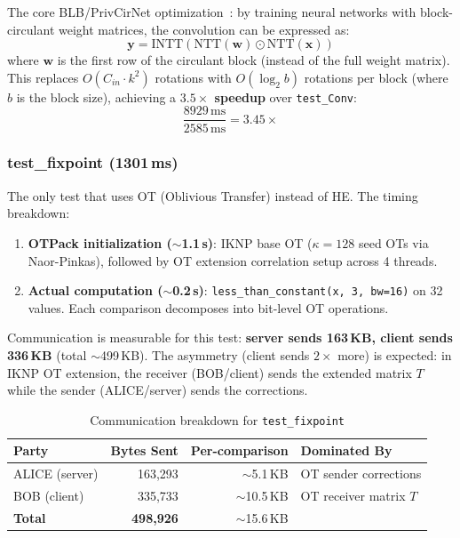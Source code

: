 The core BLB/PrivCirNet optimization~\cite{xu2024privcirnet}: by training neural networks with block-circulant weight matrices, the convolution can be expressed as:
\[
\mathbf{y} = \text{INTT}(\text{NTT}(\mathbf{w}) \odot \text{NTT}(\mathbf{x}))
\]
where $\mathbf{w}$ is the first row of the circulant block (instead of the full weight matrix).
This replaces $O(C_{in} \cdot k^2)$ rotations with $O(\log_2 b)$ rotations per block (where $b$ is the block size), achieving a \textbf{$3.5\times$ speedup} over \texttt{test\_Conv}:
\[
\frac{8929\,\text{ms}}{2585\,\text{ms}} = 3.45\times
\]

\subsubsection{test\_fixpoint (1301\,ms)}

The only test that uses OT (Oblivious Transfer) instead of HE. The timing breakdown:
\begin{enumerate}[nosep]
  \item \textbf{OTPack initialization ($\sim$1.1\,s)}: IKNP base OT ($\kappa = 128$ seed OTs via Naor-Pinkas), followed by OT extension correlation setup across 4 threads.
  \item \textbf{Actual computation ($\sim$0.2\,s)}: \texttt{less\_than\_constant(x, 3, bw=16)} on 32 values. Each comparison decomposes into bit-level OT operations.
\end{enumerate}

Communication is measurable for this test: \textbf{server sends 163\,KB, client sends 336\,KB} (total $\sim$499\,KB).
The asymmetry (client sends $2\times$ more) is expected: in IKNP OT extension, the receiver (BOB/client) sends the extended matrix $T$ while the sender (ALICE/server) sends the corrections.

\begin{table}[h]
\centering
\caption{Communication breakdown for \texttt{test\_fixpoint}}
\label{tab:comm-fixpoint}
\begin{tabular}{lrrl}
\toprule
Party & Bytes Sent & Per-comparison & Dominated By \\
\midrule
ALICE (server) & 163,293 & $\sim$5.1\,KB & OT sender corrections \\
BOB (client)   & 335,733 & $\sim$10.5\,KB & OT receiver matrix $T$ \\
\midrule
\textbf{Total} & \textbf{498,926} & $\sim$15.6\,KB & \\
\bottomrule
\end{tabular}
\end{table}

